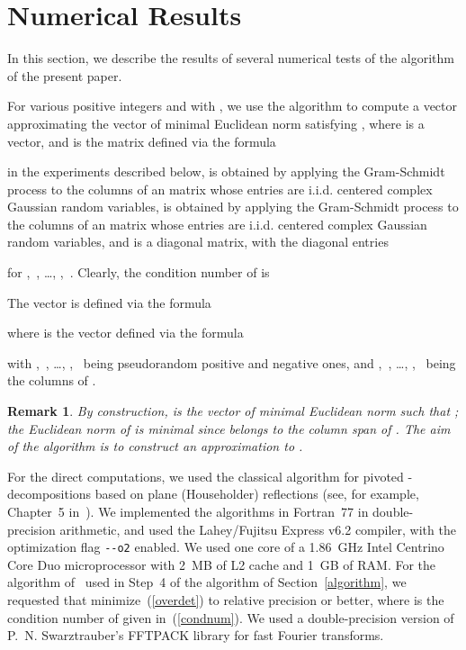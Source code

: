\documentclass[letterpaper,12pt]{article}
\newtheorem{remark1}[theorem]{Remark}
\newenvironment{remark}{\begin{remark1} \rm}{\end{remark1}}
\begin{document}
\section{Numerical Results}
\label{numerical}

In this section, we describe the results of several numerical tests
of the algorithm of the present paper.

For various positive integers  and  with ,
we use the algorithm to compute a vector 
approximating the vector  of minimal Euclidean norm
satisfying ,
where  is a vector,
and  is the matrix defined via the formula

in the experiments described below,
 is obtained by applying the Gram-Schmidt process
to the columns of an  matrix whose entries are
i.i.d. centered complex Gaussian random variables,
 is obtained by applying the Gram-Schmidt process
to the columns of an  matrix whose entries are
i.i.d. centered complex Gaussian random variables,
and  is a diagonal matrix, with the diagonal entries

for ,~, \dots, ,~.
Clearly, the condition number  of  is

The vector  is defined via the formula

where  is the vector defined via the formula

with ,~, \dots, ,~
being pseudorandom positive and negative ones,
and ,~, \dots,
,~ being the columns
of .

\begin{remark}
By construction,  is the vector of minimal Euclidean norm
such that ;
the Euclidean norm of  is minimal since 
belongs to the column span of .
The aim of the algorithm is to construct an approximation 
to .
\end{remark}

For the direct computations, we used the classical algorithm
for pivoted -de\-com\-po\-si\-tions
based on plane (Householder) reflections
(see, for example, Chapter~5 in~\cite{golub-van_loan}).
We implemented the algorithms in Fortran~77 in double-precision arithmetic,
and used the Lahey/Fujitsu Express v6.2 compiler,
with the optimization flag {\tt -{}-o2} enabled.
We used one core of a 1.86~GHz Intel Centrino Core Duo microprocessor
with 2~MB of L2 cache and 1~GB of RAM.
For the algorithm of~\cite{rokhlin-tygert} used in Step~4
of the algorithm of Section~\ref{algorithm},
we requested that  minimize~(\ref{overdet})
to relative precision  or better,
where  is the condition number of 
given in~(\ref{condnum}).
We used a double-precision version of P.~N. Swarztrauber's FFTPACK library
for fast Fourier transforms.
\end{document}
